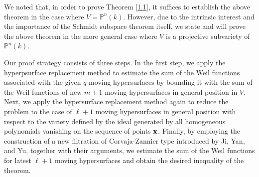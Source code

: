 \documentclass[12pt,leqno]{amsart}
\renewcommand{\P}{{\mathbb{P}}}
\numberwithin{equation}{section}
\begin{document}
We noted that, in order to prove Theorem \ref{1.1}, it suffices to establish the above theorem in the case where $V=\P^n(k)$. However, due to the intrinsic interest and the importance of the Schmidt subspace theorem itself, we state and will prove the above theorem in the more general case where $V$ is a projective subvariety of $\P^n(k)$. 

Our proof strategy consists of three steps. In the first step, we apply the hyperpsurface replacement method to estimate the sum of the Weil functions associated with the given $q$ moving hypersurfaces by bounding it with the sum of the Weil functions of new $m+1$ moving hypersurfaces in general position in $V$. Next, we apply the hypersurface replacement method again to reduce the problem to the case of  $\ell +1$ moving hypersurfaces in general position with respect to the variety defined by the ideal generated by all homogeneous polynomials vanishing on the sequence of points ${\bf x}$. Finally, by employing the construction of a new filtration of Corvaja-Zannier type introduced by Ji, Yan, and Yu, together with their arguments, we estimate the sum of the Weil functions for latest $\ell +1$ moving hypersurfaces and obtain the desired inequality of the theorem.
\end{document}

